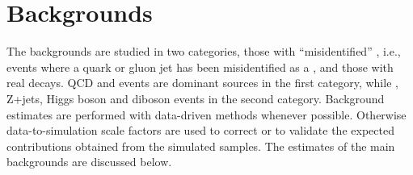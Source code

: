 \section{Backgrounds}
\label{sect:bkg}
The backgrounds are studied in two categories, those with 
``misidentified'' \Tau, i.e., events where a quark or gluon jet has been misidentified
as a \Tau, and those with real \Tau decays.
QCD and \wjets events are dominant sources in the first category, while \ttbar, Z+jets, Higgs boson and diboson
events in the second category. Background estimates are performed with data-driven methods whenever possible. 
Otherwise data-to-simulation scale factors are used to correct or to validate the expected contributions obtained from the 
simulated samples. The estimates of the main backgrounds are discussed below.

